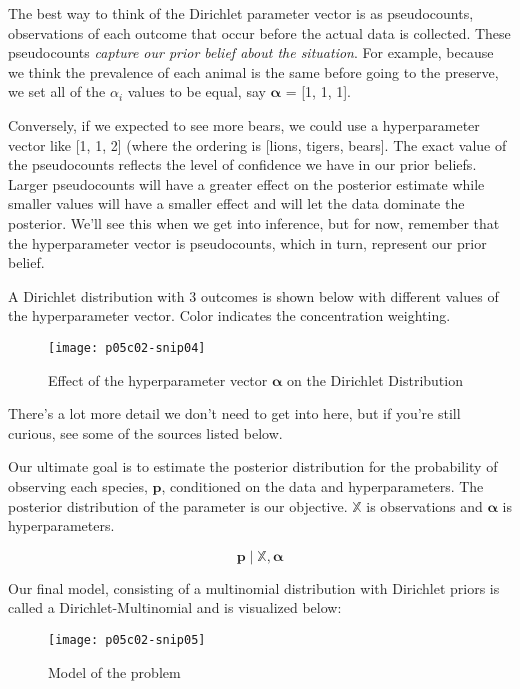 The best way to think of the Dirichlet parameter vector is as pseudocounts, observations of each outcome that occur before the actual data is collected. These pseudocounts \textit{capture our prior belief about the situation}. For example, because we think the prevalence of each animal is the same before going to the preserve, we set all of the $\alpha_i $ values to be equal, say  $\boldsymbol {\alpha }$ = [1, 1, 1].

Conversely, if we expected to see more bears, we could use a hyperparameter vector like [1, 1, 2] (where the ordering is [lions, tigers, bears]. The exact value of the pseudocounts reflects the level of confidence we have in our prior beliefs. Larger pseudocounts will have a greater effect on the posterior estimate while smaller values will have a smaller effect and will let the data dominate the posterior. We'll see this when we get into inference, but for now, remember that the hyperparameter vector is pseudocounts, which in turn, represent our prior belief.

A Dirichlet distribution with 3 outcomes is shown below \cite{FrancisTsengBayesianLearning2019} with different values of the hyperparameter vector. Color indicates the concentration weighting.

    \begin{figure*}[h]
        \texttt{[image: p05c02-snip04]}
        \caption{Effect of the hyperparameter vector $\boldsymbol {\alpha }$ on the Dirichlet Distribution}
    \end{figure*}

There's a lot more detail we don't need to get into here, but if you're still curious, see some of the sources listed below.

Our ultimate goal is to estimate the posterior distribution for the probability of observing each species, $\mathbf {p}$, conditioned on the data and hyperparameters. The posterior distribution of the parameter is our objective. $\mathbb {X}$ is observations and $\boldsymbol {\alpha }$ is hyperparameters.

\begin{equation}
    \mathbf {p}\mid \mathbb {X} ,{\boldsymbol {\alpha }}
\end{equation}

Our final model, consisting of a multinomial distribution with Dirichlet priors is called a Dirichlet-Multinomial and is visualized below:

\begin{figure*}[h]
    \texttt{[image: p05c02-snip05]}
    \caption{Model of the problem}
\end{figure*}

